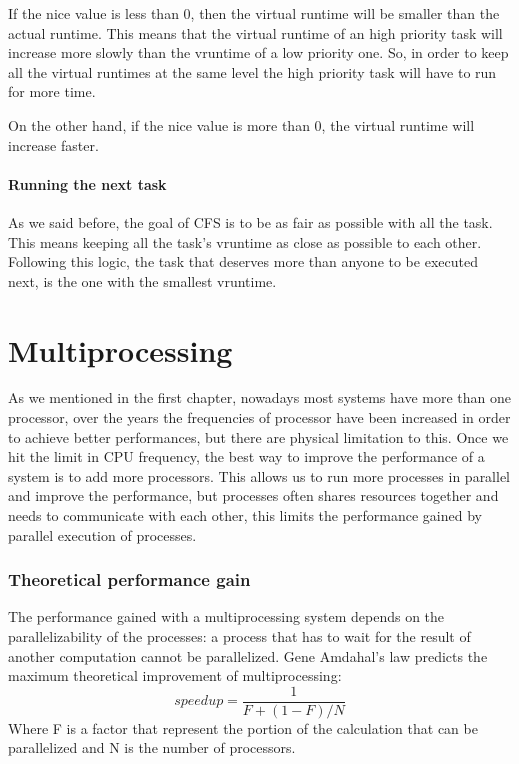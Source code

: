 \documentclass[10pt, oneside]{book}
\begin{document}
If the nice value is less than 0, then the virtual runtime will be smaller than the actual runtime. This means that the virtual runtime of an high priority task will increase more slowly than the vruntime of a low priority one. So, in order to keep all the virtual runtimes at the same level the high priority task will have to run for more time.

On the other hand, if the nice value is more than 0, the virtual runtime will increase faster.

\paragraph{Running the next task}

As we said before, the goal of CFS is to be as fair as possible with all the task. This means keeping all the task's vruntime as close as possible to each other. Following this logic, the task that deserves more than anyone to be executed next, is the one with the smallest vruntime.

\section{Multiprocessing}

As we mentioned in the first chapter, nowadays most systems have more than one processor, over the years the frequencies of processor have been increased in order to achieve better performances, but there are physical limitation to this. Once we hit the limit in CPU frequency, the best way to improve the performance of a system is to add more processors. This allows us to run more processes in parallel and improve the performance, but processes often shares resources together and needs to communicate with each other, this limits the performance gained by parallel execution of processes.

\subsubsection{Theoretical performance gain}
The performance gained with a multiprocessing system depends on the parallelizability of the processes: a process that has to wait for the result of another computation cannot be parallelized. Gene Amdahal's law predicts the maximum theoretical improvement of multiprocessing:
\begin{equation}
    speedup = \frac{1}{F + (1-F)/N}
\end{equation}
Where F is a factor that represent the portion of the calculation that can be parallelized and N is the number of processors.
\end{document}
